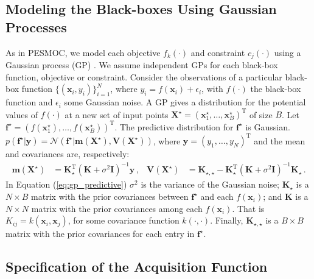 \subsection{Modeling the Black-boxes Using Gaussian Processes}

As in PESMOC, we model each objective $f_k(\cdot)$ and constraint $c_j(\cdot)$ using a Gaussian process (GP)
\citep{rasmussen2003gaussian}. 
We assume independent GPs for each black-box function, objective or constraint.
Consider the observations of a particular black-box function 
$\{(\mathbf{x}_i, y_i)\}_{i=1}^N$, where $y_i = f(\mathbf{x}_i) + \epsilon_i$, with $f(\cdot)$ the 
black-box function and $\epsilon_i$ some Gaussian noise.
A GP gives a distribution for the potential values of
$f(\cdot)$ at a new set of input points $\mathbf{X}^\star=(\mathbf{x}_1^\star,\ldots,\mathbf{x}_B^\star)^\text{T}$ 
of size $B$.  Let $\mathbf{f}^\star = (f(\mathbf{x}_1^\star),\ldots,f(\mathbf{x}_B^\star))^\text{T}$.
The predictive distribution for $\mathbf{f}^\star$ is Gaussian. 
$p(\mathbf{f}^\star|\mathbf{y}) = \mathcal{N}(\mathbf{f}^\star|\mathbf{m}(\mathbf{X}^\star), \mathbf{V}(\mathbf{X}^\star))$, 
where $\mathbf{y}=(y_1,\ldots,y_N)^\text{T}$ and the mean and covariances are, respectively:
\begin{align}
\mathbf{m}(\mathbf{X}^\star) & = \mathbf{K}_\star^\text{T} (\mathbf{K} + \sigma^2\mathbf{I})^{-1} \mathbf{y}\,, &
\mathbf{V}(\mathbf{X}^\star) & = \mathbf{K}_{\star,\star} - \mathbf{K}_\star^\text{T}
 (\mathbf{K} + \sigma^2 \mathbf{I})^{-1}\mathbf{K}_\star\,. 
\label{eq:gp_predictive}
\end{align}
In Equation (\ref{eq:gp_predictive}) $\sigma^2$ is the variance of the Gaussian noise; $\mathbf{K}_\star$ is
a $N\times B$ matrix with the prior covariances between $\mathbf{f}^\star$
and each $f(\mathbf{x}_i)$; and $\mathbf{K}$ is a $N \times N$ matrix with the prior 
covariances among each $f(\mathbf{x}_i)$. That is $K_{ij} = k(\mathbf{x}_i,\mathbf{x}_j)$, for 
some covariance function $k(\cdot,\cdot)$. 
Finally, $\mathbf{K}_{\star,\star}$ is a $B \times B$ matrix with the prior covariances for each entry in $\mathbf{f}^\star$.

\subsection{Specification of the Acquisition Function}

